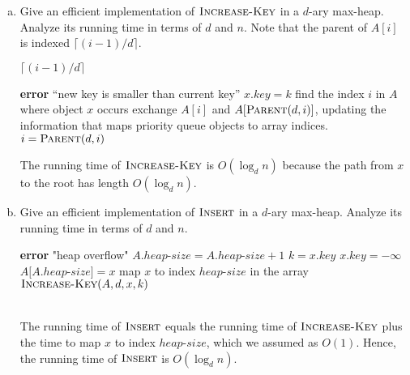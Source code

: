 \documentclass[12pt,reqno]{amsart}
\newif\ifanswer
\begin{document}
\begin{enumerate}[1.]
\begin{enumerate}[a.]
    \item Give an efficient implementation of $\textsc{Increase-Key}$ in a $d$-ary max-heap. Analyze its running time in terms of $d$ and $n$.
    \ifanswer
    \noindent {\bf \\Solution}
    Note that the parent of $A[i]$ is indexed $\lceil (i - 1)/d \rceil$.
    \begin{algorithm}
        \caption{$\textsc{Parent}(d, i)$}
        \begin{algorithmic}[1]
            \RETURN $\lceil (i - 1)/d \rceil$
        \end{algorithmic}
    \end{algorithm}

    \begin{algorithm}
        \caption{$\textsc{Increase-Key}(A, d, x, k)$}
        \begin{algorithmic}[1]
                \STATE \textbf{error} ``new key is smaller than current key''
            \ENDIF
            \STATE $x.key = k$
            \STATE find the index $i$ in $A$ where object $x$ occurs
                \STATE exchange $A[i]$ and $A[\textsc{Parent}(d, i)]$, updating the information that maps priority queue objects to array indices.
                \STATE $i = \textsc{Parent}(d, i)$
            \ENDWHILE
        \end{algorithmic}
    \end{algorithm}
    The running time of $\textsc{Increase-Key}$ is $O(\log_d{n})$ because the path from $x$ to the root has length $O(\log_d{n})$.

    \item Give an efficient implementation of $\textsc{Insert}$ in a $d$-ary max-heap. Analyze its running time in terms of $d$ and $n$.
    \ifanswer
    \noindent {\bf \\Solution}
    \begin{algorithm}
        \caption{$\textsc{Insert}(A, d, x, n)$}
        \begin{algorithmic}[1]
            \STATE \textbf{error} "heap overflow"
            \ENDIF
            \STATE $A.heap$-$size = A.heap$-$size + 1$
            \STATE $k = x.key$
            \STATE $x.key = -\infty$
            \STATE $A[A.heap$-$size] = x$
            \STATE map $x$ to index $heap$-$size$ in the array
            \STATE $\textsc{Increase-Key}(A, d, x, k)$
        \end{algorithmic}
    \end{algorithm}
    \\The running time of $\textsc{Insert}$ equals the running time of $\textsc{Increase-Key}$ plus the time to map $x$ to index $heap$-$size$, which we assumed as $O(1)$. Hence, the running time of $\textsc{Insert}$ is $O(\log_d{n})$.
\end{enumerate}
\vspace{1cm}




\end{enumerate}
\end{document}
